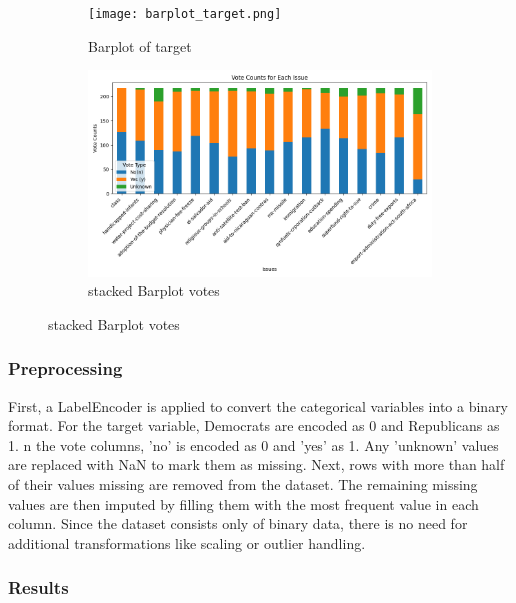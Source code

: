 \documentclass{article}
\begin{document}
\begin{figure}[H]
    \centering
    \begin{subfigure}[b]{0.45\textwidth}
        \centering
        \texttt{[image: barplot\_target.png]} 
        \caption{Barplot of target}
        \label{fig:figure1}
    \end{subfigure}
    \hspace{0.05\textwidth} %
    \begin{subfigure}[b]{0.45\textwidth}
        \centering
        \includegraphics[width=\linewidth]{stacked_barplot.png} 
        \caption{stacked Barplot votes}
        \label{fig:figure2}
    \end{subfigure}
    \label{fig:two_figures}
\end{figure}


\subsubsection{Preprocessing}
First, a LabelEncoder is applied to convert the categorical variables into a binary format.  For the target variable, Democrats are encoded as 0 and Republicans as 1.  n the vote columns, 'no' is encoded as 0 and 'yes' as 1. Any 'unknown' values are replaced with NaN to mark them as missing. Next, rows with more than half of their values missing are removed from the dataset. The remaining missing values are then imputed by filling them with the most frequent value in each column. Since the dataset consists only of binary data, there is no need for additional transformations like scaling or outlier handling. 

\subsubsection{Results}
\end{document}
